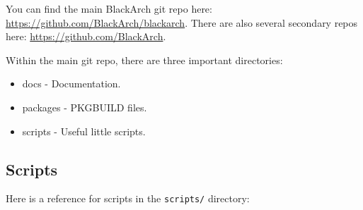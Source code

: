 \documentclass[a4paper, oneside, 11pt]{book}
\begin{document}
You can find the main BlackArch git repo here:
\href{https://github.com/BlackArch/blackarch}{https://github.com/BlackArch/blackarch}. There are
also several secondary repos here:
\href{https://github.com/BlackArch}{https://github.com/BlackArch}.

Within the main git repo, there are three important directories:

\begin{itemize}
	\item docs - Documentation.
	\item packages - PKGBUILD files.
	\item scripts - Useful little scripts.
\end{itemize}

\subsection{Scripts}

Here is a reference for scripts in the \verb|scripts/| directory:
\end{document}
